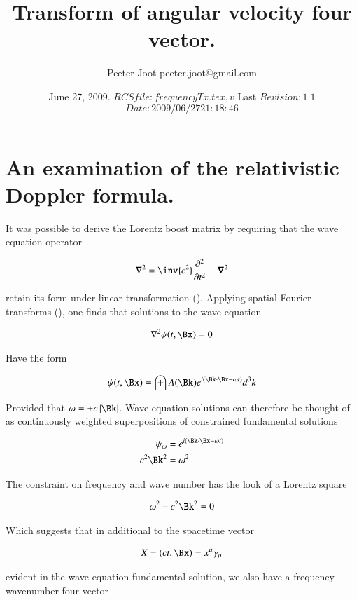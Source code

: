 \documentclass{article}
\title{Transform of angular velocity four vector.}
\author{Peeter Joot \quad peeter.joot@gmail.com }
\date{June 27, 2009.  $RCSfile: frequencyTx.tex,v $ Last $Revision: 1.1 $ $Date: 2009/06/27 21:18:46 $ }
\begin{document}
\maketitle{}
\tableofcontents
\section{An examination of the relativistic Doppler formula.}

It was possible to derive the Lorentz boost matrix by requiring that the wave equation operator

\begin{align}
\grad^2 = \inv{c^2}\frac{\partial^2}{\partial t^2} - \spacegrad^2
\end{align}

retain its form under linear transformation (\cite{PJLorentzWave}).  Applying spatial Fourier transforms (\cite{PJwaveFourier}), one finds that solutions to the wave equation 

\begin{align}
\grad^2 \psi(t,\Bx) = 0
\end{align}

Have the form

\begin{align}
\psi(t, \Bx) = \int A(\Bk) e^{i(\Bk \cdot \Bx - \omega t)} d^3 k
\end{align}

Provided that $\omega = \pm c \Abs{\Bk}$.  Wave equation solutions can therefore be thought of as continuously weighted superpositions of constrained fundamental solutions

\begin{align}
\psi_\omega &= e^{i(\Bk \cdot \Bx - \omega t)} \\
c^2 \Bk^2 &= \omega^2
\end{align}

The constraint on frequency and wave number has the look of a Lorentz square

\begin{align}
\omega^2 - c^2 \Bk^2 = 0
\end{align}

Which suggests that in additional to the spacetime vector

\begin{align}
X = (ct, \Bx) = x^\mu \gamma_\mu
\end{align}

evident in the wave equation fundamental solution, we also have a frequency-wavenumber four vector
\end{document}
